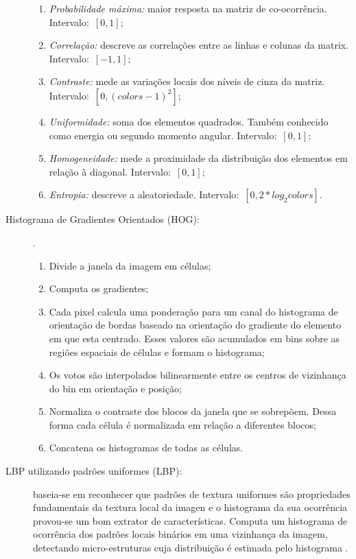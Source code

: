 \begin{description}
\begin{enumerate}
  \item \emph{Probabilidade máxima:} maior resposta na matriz de co-ocorrência. Intervalo:~$[0,1]$;
  \item \emph{Correlação:} descreve as correlações entre as linhas e colunas da matrix. Intervalo:~$[-1,1]$;
  \item \emph{Contraste:} mede as variações locais dos níveis de cinza da matriz. Intervalo:~$[0, (colors-1)^2]$;
  \item \emph{Uniformidade:} soma dos elementos quadrados. Também conhecido como energia ou segundo momento angular. Intervalo:~$[0,1]$;
  \item \emph{Homogeneidade:} mede a proximidade da distribuição dos elementos em relação à diagonal. Intervalo:~$[0,1]$;
  \item \emph{Entropia:} descreve a aleatoriedade. Intervalo:~$[0, 2*log_2 colors]$.
\end{enumerate}

\item [Histograma de Gradientes Orientados (HOG):]  \cite{Dalal2005}.

\begin{enumerate}
  \item Divide a janela da imagem em células;
  \item Computa os gradientes;
  \item Cada pixel calcula uma ponderação para um canal do histograma de orientação de bordas baseado na orientação do gradiente do elemento em que esta centrado. Esses valores são acumulados em bins sobre as regiões espaciais de células e formam o histograma;
  \item Os votos são interpolados bilinearmente entre os centros de vizinhança do bin em orientação e posição;
  \item Normaliza o contraste dos blocos da janela que se sobrepõem. Dessa forma cada célula é normalizada em relação a diferentes blocos;
  \item Concatena os histogramas de todas as células.
\end{enumerate}

\item [LBP utilizando padrões uniformes (LBP):] baseia-se em reconhecer que padrões de textura uniformes são propriedades fundamentais da textura local da imagen e o histograma da sua ocorrência provou-se um bom extrator de características. Computa um histograma de ocorrência dos padrões locais binários em uma vizinhança da imagem, detectando micro-estruturas cuja distribuição é estimada pelo histograma \cite{Ojala2002}.


\end{description}
